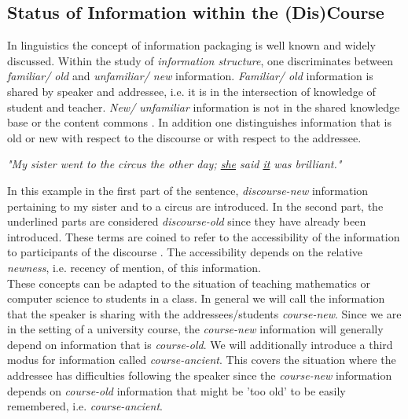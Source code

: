 \documentclass[twoside, 12pt]{article}
\begin{document}
\subsection{Status of Information within the (Dis)Course}
\label{sec:infostatus}

In linguistics the concept of information packaging \cite{CambridgeGrammar:npentrel14} is well known and widely discussed. Within the study of \textit{information structure}, one discriminates between \textit{familiar/ old} and \textit{unfamiliar/ new} information. \textit{Familiar/ old} information is shared by speaker and addressee, i.e. it is in the intersection of knowledge of student and teacher. \textit{New/ unfamiliar} information is not in the shared knowledge base or the content commons \cite{CNX:whitepaper}. In addition one distinguishes information that is old or new with respect to the discourse or with respect to the addressee.

\begin{center}
\textit{"My sister went to the circus the other day; \underline{she} said \underline{it} was brilliant."}\\
\end{center}

In this example in the first part of the sentence, \textit{discourse-new} information pertaining to my sister and to a circus are introduced. In the second part, the underlined parts are considered \textit{discourse-old} since they have already been introduced. These terms are coined to refer to the accessibility of the information to participants of the discourse \cite{Newness:npentrel14}. The accessibility depends on the relative \textit{newness}, i.e. recency of mention, of this information.\\

These concepts can be adapted to the situation of teaching mathematics or computer science to students in a class. In general we will call the information that the speaker is sharing with the addressees/students \textit{course-new}. Since we are in the setting of a university course, the \textit{course-new} information will generally depend on information that is \textit{course-old}. We will additionally introduce a third modus for information called \textit{course-ancient}. This covers the situation where the addressee has difficulties following the speaker since the \textit{course-new} information depends on \textit{course-old} information that might be 'too old' to be easily remembered, i.e. \textit{course-ancient}.\\
\end{document}

